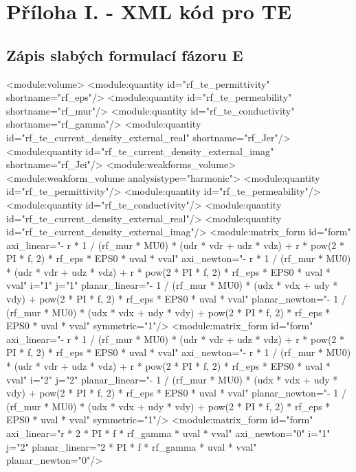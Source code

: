 \documentclass[12pt,a4paper,oneside]{article}
\numberwithin{equation}{section} %
\numberwithin{figure}{section} %
\numberwithin{table}{section} %
\begin{document}
\newpage
\pagestyle{empty} %
\setcounter{page}{1} %
\appendix %
\section*{Příloha I. - XML kód pro TE}
\subsection*{Zápis slabých formulací fázoru E}
\label{xmlE}
\begin{spverbatim}
 <module:volume>
    <module:quantity id="rf_te_permittivity" shortname="rf_eps"/>
    <module:quantity id="rf_te_permeability" shortname="rf_mur"/>
    <module:quantity id="rf_te_conductivity" shortname="rf_gamma"/>
    <module:quantity id="rf_te_current_density_external_real" shortname="rf_Jer"/>
    <module:quantity id="rf_te_current_density_external_imag" shortname="rf_Jei"/>
    <module:weakforms_volume>
      <module:weakform_volume analysistype="harmonic">
        <module:quantity id="rf_te_permittivity"/>
        <module:quantity id="rf_te_permeability"/>
        <module:quantity id="rf_te_conductivity"/>
        <module:quantity id="rf_te_current_density_external_real"/>
        <module:quantity id="rf_te_current_density_external_imag"/>
        <module:matrix_form id="form" axi_linear="- r * 1 / (rf_mur * MU0) * (udr * vdr + udz * vdz) + r * pow(2 * PI * f, 2) * rf_eps * EPS0 * uval * vval" axi_newton="- r * 1 / (rf_mur * MU0) * (udr * vdr + udz * vdz) + r * pow(2 * PI * f, 2) * rf_eps * EPS0 * uval * vval" i="1" j="1" planar_linear="- 1 / (rf_mur * MU0) * (udx * vdx + udy * vdy) + pow(2 * PI * f, 2) * rf_eps * EPS0 * uval * vval" planar_newton="- 1 / (rf_mur * MU0) * (udx * vdx + udy * vdy) + pow(2 * PI * f, 2) * rf_eps * EPS0 * uval * vval" symmetric="1"/>
        <module:matrix_form id="form" axi_linear="- r * 1 / (rf_mur * MU0) * (udr * vdr + udz * vdz) + r * pow(2 * PI * f, 2) * rf_eps * EPS0 * uval * vval" axi_newton="- r * 1 / (rf_mur * MU0) * (udr * vdr + udz * vdz) + r * pow(2 * PI * f, 2) * rf_eps * EPS0 * uval * vval" i="2" j="2" planar_linear="- 1 / (rf_mur * MU0) * (udx * vdx + udy * vdy) + pow(2 * PI * f, 2) * rf_eps * EPS0 * uval * vval" planar_newton="- 1 / (rf_mur * MU0) * (udx * vdx + udy * vdy) + pow(2 * PI * f, 2) * rf_eps * EPS0 * uval * vval" symmetric="1"/>
        <module:matrix_form id="form" axi_linear="r * 2 * PI * f * rf_gamma * uval * vval" axi_newton="0" i="1" j="2" planar_linear="2 * PI * f * rf_gamma * uval * vval" planar_newton="0"/>

\end{spverbatim}
\end{document}
